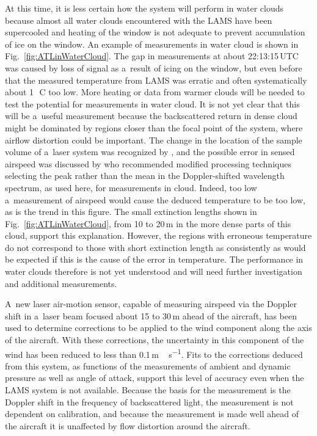 \documentclass[amtd, online, hvmath]{copernicus}
\begin{document}
At this time, it is less certain how the system will perform in water
clouds because almost all water clouds encountered with the LAMS have
been supercooled and heating of the window is not adequate to prevent
accumulation of ice on the window. An example of measurements in water
cloud is shown in Fig.~\ref{fig:ATLinWaterCloud}. The gap in
measurements at about 22:13:15\,UTC was caused by loss of signal as
a~result of icing on the window, but even before that the measured
temperature from LAMS was erratic and often systematically about
1\,\unit{{\degree}C} too low. More heating or data from warmer clouds
will be needed to test the potential for measurements in water
cloud. It is not yet clear that this will be a~useful measurement
because the backscattered return in dense cloud might be dominated by
regions closer than the focal point of the system, where airflow
distortion could be important.  The change in the location of the
sample volume of a~laser system was recognized by \citet{Werner:84},
and the possible error in sensed airspeed was discussed by
\citet{KeelerEtAl1987} who recommended modified processing techniques
selecting the peak rather than the mean in the Doppler-shifted
wavelength spectrum, as used here, for measurements in cloud. Indeed,
too low a~measurement of airspeed would cause the deduced temperature
to be too low, as is the trend in this figure. The small extinction
lengths shown in Fig.~\ref{fig:ATLinWaterCloud}, from 10 to 20\,m in
the more dense parts of this cloud, support this explanation. However,
the regions with erroneous temperature do not correspond to those with
short extinction length as consistently as would be expected if this
is the cause of the error in temperature.  The performance in water
clouds therefore is not yet understood and will need further
investigation and additional measurements.


A~new laser air-motion sensor, capable of measuring airspeed via the
Doppler shift in a~laser beam focused about 15 to 30\,m ahead of the
aircraft, has been used to determine corrections to be applied to the
wind component along the axis of the aircraft. With these corrections,
the uncertainty in this component of the wind has been reduced to less
than 0.1\,\unit{m\,s^{-1}}. Fits to the corrections deduced from this
system, as functions of the measurements of ambient and dynamic
pressure as well as angle of attack, support this level of accuracy
even when the LAMS system is not available. Because the basis for the
measurement is the Doppler shift in the frequency of backscattered
light, the measurement is not dependent on calibration, and because
the measurement is made well ahead of the aircraft it is unaffected by
flow distortion around the aircraft.
\end{document}
